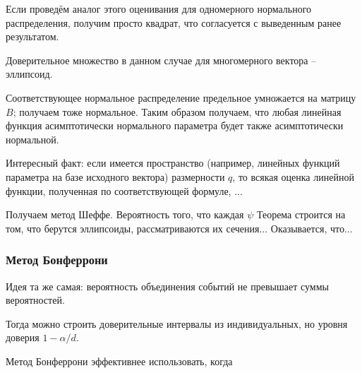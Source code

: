 \documentclass[main.tex]{subfiles}
\begin{document}

Если проведём аналог этого оценивания для одномерного нормального распределения, получим просто квадрат, что согласуется с выведенным ранее результатом.

Доверительное множество в данном случае для многомерного вектора -- эллипсоид.


Соответствующее нормальное распределение предельное умножается на матрицу $ B $; получаем тоже нормальное.
Таким образом получаем, что любая линейная функция асимптотически нормального параметра будет также асимптотически нормальной.

Интересный факт: если имеется пространство (например, линейных функций параметра на базе исходного вектора) размерности $q$, то всякая оценка линейной функции, полученная по соответствующей формуле, ...


Получаем метод Шеффе.
Вероятность того, что каждая $ \psi $
Теорема строится на том, что берутся эллипсоиды, рассматриваются их сечения...
Оказывается, что...

\subsubsection{Метод Бонферрони}

Идея та же самая: вероятность объединения событий не превышает суммы вероятностей.

Тогда можно строить доверительные интервалы из индивидуальных, но уровня доверия $ 1 - \alpha / d $.

Метод Бонферрони эффективнее использовать, когда 
\end{document}
